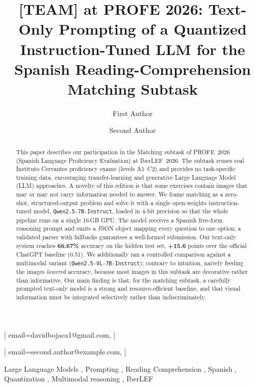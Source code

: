 \documentclass{ceurart}   %
\begin{document}


\title{[TEAM] at PROFE 2026: Text-Only Prompting of a Quantized
  Instruction-Tuned LLM for the Spanish Reading-Comprehension Matching Subtask}

\author[1]{First Author}[
  email=davidbojaca1@gmail.com,
]
\author[1]{Second Author}[
  email=second.author@example.com,
]
\address[1]{[Affiliation / University], Spain} %

\begin{abstract}
  This paper describes our participation in the Matching subtask of
  PROFE~2026 (Spanish Language Proficiency Evaluation) at IberLEF~2026.
  The subtask reuses real Instituto Cervantes proficiency exams (levels
  A1--C2) and provides no task-specific training data, encouraging
  transfer-learning and generative Large Language Model (LLM) approaches.
  A novelty of this edition is that some exercises contain images that may
  or may not carry information needed to answer.
  We frame matching as a zero-shot, structured-output problem and solve it
  with a single open-weights instruction-tuned model,
  \texttt{Qwen2.5-7B-Instruct}, loaded in 4-bit precision so that the whole
  pipeline runs on a single 16\,GB GPU. The model receives a Spanish
  free-form reasoning prompt and emits a JSON object mapping every question
  to one option; a validated parser with fallbacks guarantees a well-formed
  submission. Our text-only system reaches \textbf{66.67\%} accuracy on the
  hidden test set, \textbf{+15.6} points over the official ChatGPT baseline
  (0.51). We additionally ran a controlled comparison against a multimodal
  variant (\texttt{Qwen2.5-VL-7B-Instruct}); contrary to intuition, naively
  feeding the images \emph{lowered} accuracy, because most images in this
  subtask are decorative rather than informative. Our main finding is that,
  for the matching subtask, a carefully prompted text-only model is a strong
  and resource-efficient baseline, and that visual information must be
  integrated selectively rather than indiscriminately.
\end{abstract}

\begin{keywords}
  Large Language Models \sep
  Prompting \sep
  Reading Comprehension \sep
  Spanish \sep
  Quantization \sep
  Multimodal reasoning \sep
  IberLEF
\end{keywords}
\end{document}
